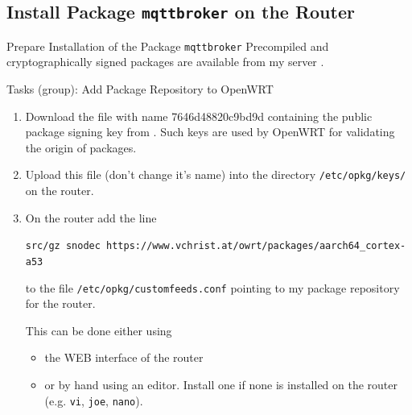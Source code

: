 ﻿\subsection{Install Package \texttt{mqttbroker} on the Router}

\begin{frame}[fragile]{Prepare Installation of the Package \alert{\texttt{mqttbroker}}}
{\href{https://github.com/SNodeC/mqttbroker}{}}
\alert{Precompiled and cryptographically signed packages} are available from \alert{my server} \href{https://www.vchrist.at/owrt}{}.
\begin{exampleblock}{Tasks (group): Add Package Repository to OpenWRT}
\begin{enumerate}
  \item \alert{Download} the file with name \alert{7646d48820c9bd9d} containing the \alert{public} package signing \alert{key} from \href{https://www.vchrist.at/owrt}{}. Such \alert{keys} are used by OpenWRT for \alert{validating} the \alert{origin} of packages.
  \item \alert{Upload} this file (\alert{don't change it's name}) into the directory \alert{\texttt{/etc/opkg/keys/}} on the router.
  \item On the router \alert{add} the line
  \parbox{0.9\textwidth}{
  \setlength{\textwidth}{0.9\textwidth}
  \begin{block}{}
  \centering\texttt{src/gz snodec https://www.vchrist.at/owrt/packages/aarch64\_cortex-a53}
  \end{block}
  }

    to the file \alert{\texttt{/etc/opkg/customfeeds.conf}} pointing to my \alert{package repository} for the router.
  This can be done either using
  \begin{itemize}
    \item the \alert{WEB interface} of the router
    \item or \alert{by hand} using an \alert{editor}. Install one if none is installed on the router (e.g. \texttt{vi}, \texttt{joe}, \texttt{nano}).
  \end{itemize}
\end{enumerate}
\end{exampleblock}
\end{frame}
